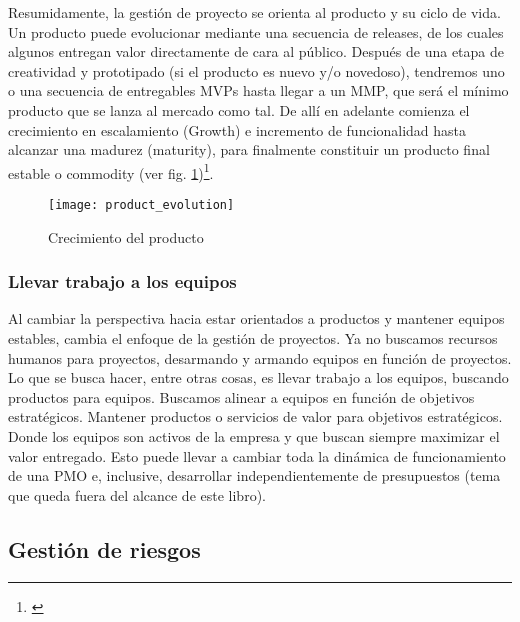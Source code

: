 Resumidamente, la gestión de proyecto se orienta al producto y su ciclo de vida. Un producto puede evolucionar mediante una secuencia de releases, de los cuales algunos entregan valor directamente de cara al público. Después de una etapa de creatividad y prototipado (si el producto es nuevo y/o novedoso), tendremos uno o una secuencia de entregables MVPs hasta llegar a un MMP, que será el mínimo producto que se lanza al mercado como tal. De allí en adelante comienza el crecimiento en escalamiento (Growth) e incremento de funcionalidad hasta alcanzar una madurez (maturity), para finalmente constituir un producto final estable o commodity (ver fig. \ref{fig:product_evolution})\footnote{\cite{Greg-Gehrich-2012}}.

\begin{figure}[h]
  \centering
  \texttt{[image: product\_evolution]}
  \caption{Crecimiento del producto}
  \centering
  \label{fig:product_evolution} %
\end{figure}

\subsubsection{Llevar trabajo a los equipos}

Al cambiar la perspectiva hacia estar orientados a productos y mantener equipos estables, cambia el enfoque de la gestión de proyectos. Ya no buscamos recursos humanos para proyectos, desarmando y armando equipos en función de proyectos. Lo que se busca hacer, entre otras cosas, es llevar trabajo a los equipos, buscando productos para equipos. Buscamos alinear a equipos en función de objetivos estratégicos. Mantener productos o servicios de valor para objetivos estratégicos. Donde los equipos son activos de la empresa y que buscan siempre maximizar el valor entregado. Esto puede llevar a cambiar toda la dinámica de funcionamiento de una PMO e, inclusive, desarrollar independientemente de presupuestos (tema que queda fuera del alcance de este libro).


\subsection{Gestión de riesgos}

